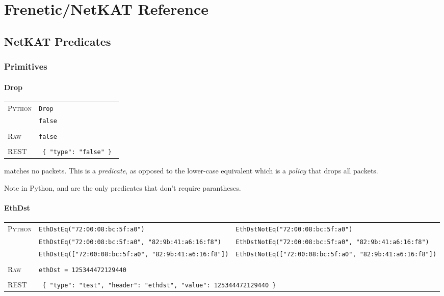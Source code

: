 
\chapter{Frenetic/NetKAT Reference}
\label{netkat_reference}

\section{NetKAT Predicates}
\label{netkat_reference:predicates}

\subsection{Primitives}

\subsubsection{Drop}

\bigskip
\begin{tabularx}{\linewidth}{lX}
\textsc{Python}   & \texttt{Drop} \\
   & \texttt{false} \\ \\
\textsc{Raw}    & \texttt{false}  \\ \\
\textsc{REST} & \texttt{ \{ "type": "false" \} } 
\end{tabularx}

 matches no packets.  This is a \emph{predicate}, as opposed to the lower-case 
equivalent  
which is a \emph{policy} that drops all packets. 

Note in Python,  and  are the only predicates that don't require parantheses.

\subsubsection{EthDst}

\bigskip
\begin{tabularx}{\linewidth}{lXX}
\textsc{Python}   & \texttt{EthDstEq("72:00:08:bc:5f:a0")}    & \texttt{EthDstNotEq("72:00:08:bc:5f:a0")} \\
    & \texttt{EthDstEq("72:00:08:bc:5f:a0", "82:9b:41:a6:16:f8")}  & \texttt{EthDstNotEq("72:00:08:bc:5f:a0", "82:9b:41:a6:16:f8")} \\
    & \texttt{EthDstEq(["72:00:08:bc:5f:a0", "82:9b:41:a6:16:f8"])}  & \texttt{EthDstNotEq(["72:00:08:bc:5f:a0", "82:9b:41:a6:16:f8"])} \\ \\
\textsc{Raw}    & \texttt{ethDst = 125344472129440}     & \\ \\
\textsc{REST} & \multicolumn{2}{l}{\texttt{ \{ "type": "test", "header": "ethdst", "value": 125344472129440 \} }} 
\end{tabularx}

